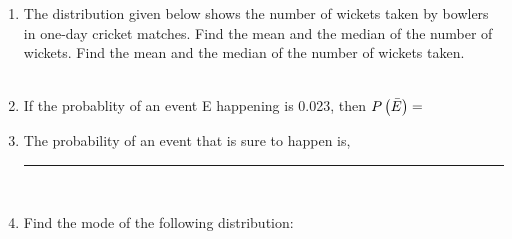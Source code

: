 \documentclass[journal,12pt,twocolumn]{IEEEtran}
\begin{document}
\begin{enumerate}
     \vspace{2mm}\\
    \vspace{2mm}\\
    \item The distribution given below shows the number of wickets taken by bowlers in one-day cricket matches. Find the mean and the median of the number of wickets. Find the mean and the median of the number of wickets taken.\\
     \vspace{2mm}\\
	\item If the probablity of an event E happening is 0.023, then $P\left(\bar{E}\right) = $\\

\item The probability of an event that is sure to happen is, \rule{1.5cm}{0.15mm}\\
     \item Find the mode of the following distribution:\\
     \vspace{2mm}\\
     \vspace{2mm}

\end{enumerate}
\end{document}
